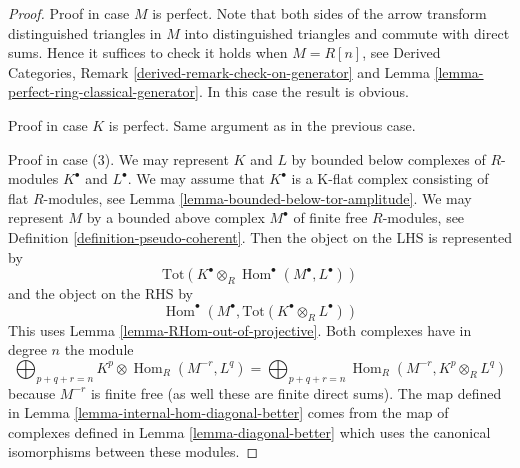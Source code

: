 \documentclass[10pt,a4paper]{amsart}
\theoremstyle{plain}
\theoremstyle{definition}
\theoremstyle{remark}
\numberwithin{equation}{subsection}
\def\Hom{\mathop{\mathrm{Hom}}\nolimits}
\begin{document}
\begin{proof}
Proof in case $M$ is perfect. Note that both sides of the arrow
transform distinguished triangles in $M$ into distinguished triangles
and commute with direct sums. Hence it suffices to check
it holds when $M = R[n]$, see
Derived Categories, Remark \ref{derived-remark-check-on-generator}
and Lemma \ref{lemma-perfect-ring-classical-generator}.
In this case the result is obvious.

\medskip\noindent
Proof in case $K$ is perfect. Same argument as in the previous case.

\medskip\noindent
Proof in case (3). We may represent $K$ and $L$ by
bounded below complexes of $R$-modules $K^\bullet$ and $L^\bullet$.
We may assume that $K^\bullet$ is a K-flat complex
consisting of flat $R$-modules, see
Lemma \ref{lemma-bounded-below-tor-amplitude}.
We may represent $M$ by a bounded above complex $M^\bullet$
of finite free $R$-modules, see Definition \ref{definition-pseudo-coherent}.
Then the object on the LHS is represented by
$$
\text{Tot}(K^\bullet \otimes_R \Hom^\bullet(M^\bullet, L^\bullet))
$$
and the object on the RHS by
$$
\Hom^\bullet(M^\bullet, \text{Tot}(K^\bullet \otimes_R L^\bullet))
$$
This uses Lemma \ref{lemma-RHom-out-of-projective}.
Both complexes have in degree $n$ the module
$$
\bigoplus\nolimits_{p + q + r = n} K^p \otimes \Hom_R(M^{-r}, L^q) =
\bigoplus\nolimits_{p + q + r = n} \Hom_R(M^{-r}, K^p \otimes_R L^q)
$$
because $M^{-r}$ is finite free (as well these are finite direct sums).
The map defined in Lemma \ref{lemma-internal-hom-diagonal-better}
comes from the map of complexes defined in
Lemma \ref{lemma-diagonal-better} which uses
the canonical isomorphisms between these modules.
\end{proof}
\end{document}
